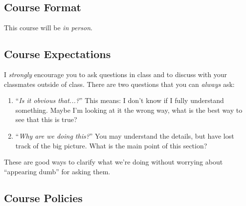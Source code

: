 \documentclass[12pt]{article}
\numberwithin{equation}{section}    %
\begin{document}
\subsection{Course Format}

This course will be \emph{in person}. 

\subsection{Course Expectations}

I \emph{strongly} encourage you to ask questions in class and to discuss with your classmates outside of class. There are two questions that you can \emph{always} ask:
\begin{enumerate}
	\item ``\emph{Is it obvious that...?}'' This means: I don't know if I fully understand something. Maybe I'm looking at it the wrong way, what is the best way to see that this is true? 
	\item ``\emph{Why are we doing this?}'' You may understand the details, but have lost track of the big picture. What is the main point of this section?
\end{enumerate}
These are good ways to clarify what we're doing without worrying about ``appearing dumb'' for asking them.

\subsection{Course Policies}
\end{document}
